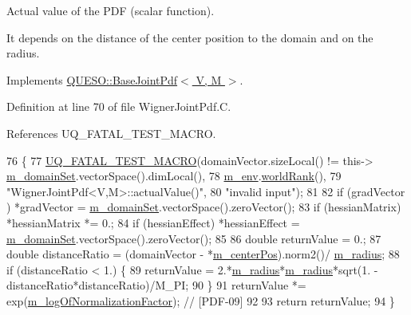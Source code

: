 Actual value of the P\-D\-F (scalar function). 

It depends on the distance of the center position to the domain and on the radius. 

Implements \hyperlink{class_q_u_e_s_o_1_1_base_joint_pdf_a3c367a0cc3fb707a136c5df47dd414c1}{Q\-U\-E\-S\-O\-::\-Base\-Joint\-Pdf$<$ V, M $>$}.



Definition at line 70 of file Wigner\-Joint\-Pdf.\-C.



References U\-Q\-\_\-\-F\-A\-T\-A\-L\-\_\-\-T\-E\-S\-T\-\_\-\-M\-A\-C\-R\-O.


\begin{DoxyCode}
76 \{
77   \hyperlink{_defines_8h_a56d63d18d0a6d45757de47fcc06f574d}{UQ\_FATAL\_TEST\_MACRO}(domainVector.sizeLocal() != this->
      \hyperlink{class_q_u_e_s_o_1_1_base_scalar_function_a67696e86211197938c72cd11863f5cf8}{m\_domainSet}.vectorSpace().dimLocal(),
78                       \hyperlink{class_q_u_e_s_o_1_1_base_scalar_function_adf44141aeb765d97613286f88f235f04}{m\_env}.\hyperlink{class_q_u_e_s_o_1_1_base_environment_a78b57112bbd0e6dd0e8afec00b40ffa7}{worldRank}(),
79                       \textcolor{stringliteral}{"WignerJointPdf<V,M>::actualValue()"},
80                       \textcolor{stringliteral}{"invalid input"});
81 
82   \textcolor{keywordflow}{if} (gradVector   ) *gradVector     = \hyperlink{class_q_u_e_s_o_1_1_base_scalar_function_a67696e86211197938c72cd11863f5cf8}{m\_domainSet}.vectorSpace().zeroVector();
83   \textcolor{keywordflow}{if} (hessianMatrix) *hessianMatrix *= 0.;
84   \textcolor{keywordflow}{if} (hessianEffect) *hessianEffect  = \hyperlink{class_q_u_e_s_o_1_1_base_scalar_function_a67696e86211197938c72cd11863f5cf8}{m\_domainSet}.vectorSpace().zeroVector();
85 
86   \textcolor{keywordtype}{double} returnValue = 0.;
87   \textcolor{keywordtype}{double} distanceRatio = (domainVector - *\hyperlink{class_q_u_e_s_o_1_1_wigner_joint_pdf_abca40c4e75cf4429fbbe8ef077282ce8}{m\_centerPos}).norm2()/
      \hyperlink{class_q_u_e_s_o_1_1_wigner_joint_pdf_a05e7841821be3fea3990e64f40af813d}{m\_radius};
88   \textcolor{keywordflow}{if} (distanceRatio < 1.) \{
89     returnValue = 2.*\hyperlink{class_q_u_e_s_o_1_1_wigner_joint_pdf_a05e7841821be3fea3990e64f40af813d}{m\_radius}*\hyperlink{class_q_u_e_s_o_1_1_wigner_joint_pdf_a05e7841821be3fea3990e64f40af813d}{m\_radius}*sqrt(1. - distanceRatio*distanceRatio)/M\_PI;
90   \}
91   returnValue *= exp(\hyperlink{class_q_u_e_s_o_1_1_base_joint_pdf_ae82d4191f17af8c7a26226d127bc7850}{m\_logOfNormalizationFactor}); \textcolor{comment}{// [PDF-09]}
92 
93   \textcolor{keywordflow}{return} returnValue;
94 \}
\end{DoxyCode}
